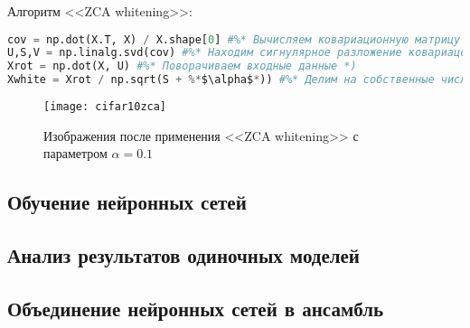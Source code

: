 Алгоритм <<ZCA whitening>>:
\begin{lstlisting}[language=Python, frame=TB]
cov = np.dot(X.T, X) / X.shape[0] #%* Вычисляем ковариационную матрицу *)
U,S,V = np.linalg.svd(cov) #%* Находим сигнулярное разложение ковариацонной матрицы *)
Xrot = np.dot(X, U) #%* Поворачиваем входные данные *)
Xwhite = Xrot / np.sqrt(S + %*$\alpha$*)) #%* Делим на собственные числа *)
\end{lstlisting}
\vspace*{-1.4cm}
\begin{figure}[h]
    \centering
    \texttt{[image: cifar10zca]}
    \caption{Изображения после применения <<ZCA whitening>> с параметром $\alpha=0.1$}
\end{figure}

\subsection{Обучение нейронных сетей}
\subsection{Анализ результатов одиночных моделей}
\subsection{Объединение нейронных сетей в ансамбль}